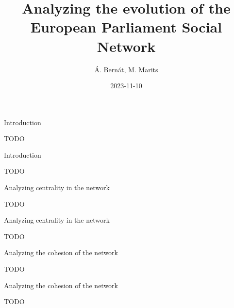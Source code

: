 \documentclass{beamer}
\title{Analyzing the evolution of the European Parliament Social Network}
\date{2023-11-10}
\author{Á. Bernát, M. Marits}
\begin{document}
\begin{frame}[plain]
    \maketitle
\end{frame}

\begin{frame}{Introduction}
	
	TODO
	
\end{frame}

\begin{frame}{Introduction}
	
	TODO
	
\end{frame}

\begin{frame}{Analyzing centrality in the network}
	
	TODO
	
\end{frame}

\begin{frame}{Analyzing centrality in the network}
	
	TODO
	
\end{frame}

\begin{frame}{Analyzing the cohesion of the network}
	
	TODO
	
\end{frame}

\begin{frame}{Analyzing the cohesion of the network}
	
	TODO
	
\end{frame}
\end{document}
